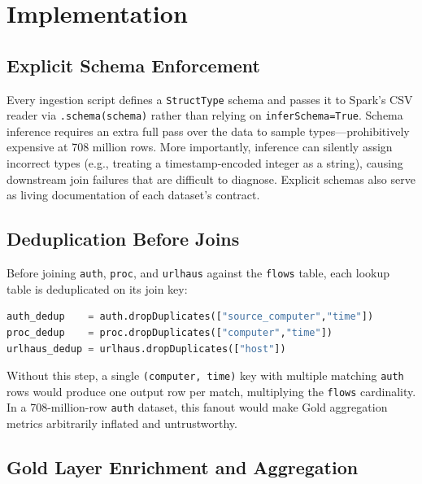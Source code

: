 \documentclass[conference]{IEEEtran}
\begin{document}
\section{Implementation}
\label{sec:impl}

\subsection{Explicit Schema Enforcement}

Every ingestion script defines a \texttt{StructType} schema and passes it to Spark's CSV reader via \texttt{.schema(schema)} rather than relying on \texttt{inferSchema=True}. Schema inference requires an extra full pass over the data to sample types---prohibitively expensive at 708 million rows. More importantly, inference can silently assign incorrect types (e.g., treating a timestamp-encoded integer as a string), causing downstream join failures that are difficult to diagnose. Explicit schemas also serve as living documentation of each dataset's contract.

\subsection{Deduplication Before Joins}

Before joining \texttt{auth}, \texttt{proc}, and \texttt{urlhaus} against the \texttt{flows} table, each lookup table is deduplicated on its join key:

\begin{lstlisting}[language=Python, caption={Deduplication prior to join.}]
auth_dedup    = auth.dropDuplicates(["source_computer","time"])
proc_dedup    = proc.dropDuplicates(["computer","time"])
urlhaus_dedup = urlhaus.dropDuplicates(["host"])
\end{lstlisting}

Without this step, a single \texttt{(computer, time)} key with multiple matching \texttt{auth} rows would produce one output row per match, multiplying the \texttt{flows} cardinality. In a 708-million-row \texttt{auth} dataset, this fanout would make Gold aggregation metrics arbitrarily inflated and untrustworthy.

\subsection{Gold Layer Enrichment and Aggregation}
\label{sec:enrich}
\end{document}
